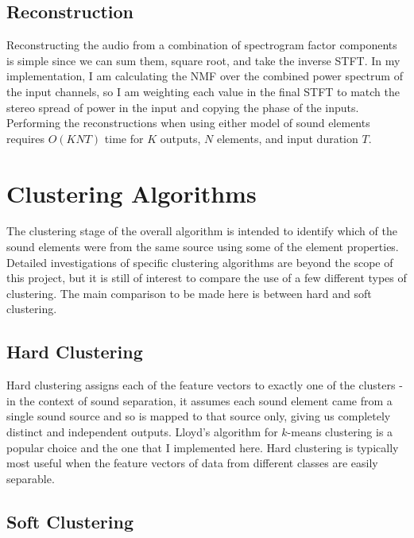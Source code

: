 \documentclass[12pt,a4paper,twoside,openright]{report}
\begin{document}

\subsection{Reconstruction}

Reconstructing the audio from a combination of spectrogram factor components is simple since we can sum them, square root, and take the inverse STFT. In my implementation, I am calculating the NMF over the combined power spectrum of the input channels, so I am weighting each value in the final STFT to match the stereo spread of power in the input and copying the phase of the inputs. Performing the reconstructions when using either model of sound elements requires $ O(KNT) $ time for $ K $ outputs, $ N $ elements, and input duration $ T $.

\section{Clustering Algorithms}

The clustering stage of the overall algorithm is intended to identify which of the sound elements were from the same source using some of the element properties. Detailed investigations of specific clustering algorithms are beyond the scope of this project, but it is still of interest to compare the use of a few different types of clustering. The main comparison to be made here is between hard and soft clustering. 

\subsection{Hard Clustering}

Hard clustering assigns each of the feature vectors to exactly one of the clusters - in the context of sound separation, it assumes each sound element came from a single sound source and so is mapped to that source only, giving us completely distinct and independent outputs. Lloyd's algorithm for $ k $-means clustering \cite{lloyd1982least} is a popular choice and the one that I implemented here. Hard clustering is typically most useful when the feature vectors of data from different classes are easily separable.

\subsection{Soft Clustering}
\end{document}

